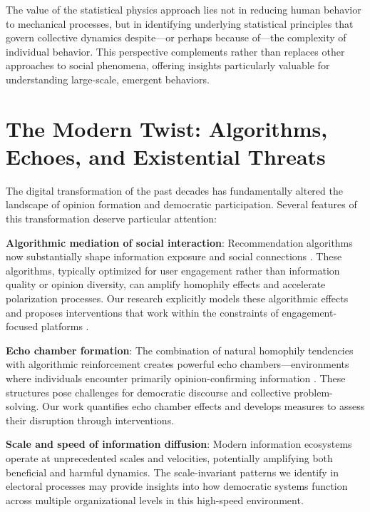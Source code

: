 The value of the statistical physics approach lies not in reducing human behavior to mechanical processes, but in identifying underlying statistical principles that govern collective dynamics despite—or perhaps because of—the complexity of individual behavior. This perspective complements rather than replaces other approaches to social phenomena, offering insights particularly valuable for understanding large-scale, emergent behaviors.

\section{The Modern Twist: Algorithms, Echoes, and Existential Threats}

The digital transformation of the past decades has fundamentally altered the landscape of opinion formation and democratic participation. Several features of this transformation deserve particular attention:

\textbf{Algorithmic mediation of social interaction}: Recommendation algorithms now substantially shape information exposure and social connections \cite{link-recommendation-algorithms-and-dynamics-of-polarization-in-social-networks}. These algorithms, typically optimized for user engagement rather than information quality or opinion diversity, can amplify homophily effects and accelerate polarization processes. Our research explicitly models these algorithmic effects and proposes interventions that work within the constraints of engagement-focused platforms \cite{depolarization-of-echo-chambers-by-random-dynamical-nudge}.

\textbf{Echo chamber formation}: The combination of natural homophily tendencies \cite{birds-of-a-feather-homophily-in-social-networks} with algorithmic reinforcement creates powerful echo chambers—environments where individuals encounter primarily opinion-confirming information \cite{echo-chambers-online, echo-chambers-emotional-contagion-and-group-polarization-on-facebook}. These structures pose challenges for democratic discourse and collective problem-solving. Our work quantifies echo chamber effects and develops measures to assess their disruption through interventions.

\textbf{Scale and speed of information diffusion}: Modern information ecosystems operate at unprecedented scales and velocities, potentially amplifying both beneficial and harmful dynamics. The scale-invariant patterns we identify in electoral processes may provide insights into how democratic systems function across multiple organizational levels in this high-speed environment.

